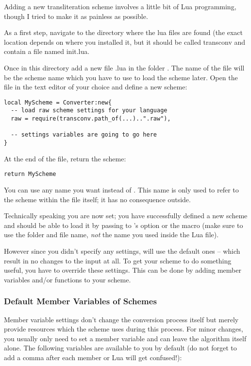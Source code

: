 \documentclass{ltxdockit}
\begin{document}
Adding a new transliteration scheme involves a little bit of Lua programming,
though I tried to make it as painless as possible.

As a first step, navigate to the directory where the  lua files are
found (the exact location depends on where you installed it, but it should be
called transconv and contain a file named init.lua.

Once in this directory add a new file .lua in the folder .
The name of the file will be the scheme name which you have to use to load the
scheme later. Open the file in the text editor of your choice and define a new
scheme:

\begin{lstlisting}
local MyScheme = Converter:new{
  -- load raw scheme settings for your language
  raw = require(transconv.path_of(...)..".raw"),

  -- settings variables are going to go here
}
\end{lstlisting}

At the end of the file, return the scheme:

\begin{lstlisting}
return MyScheme
\end{lstlisting}

You can use any name you want instead of . This name is only used
to refer to the scheme within the file itself; it has no consequence outside.

Technically speaking you are now set; you have successfully defined a new scheme
and should be able to load it by passing  to
's  option or the
 macro (make sure to use the
folder and file name, \emph{not} the name you used inside the Lua file).

However since you didn't specify any settings,  will use the
default ones -- which result in no changes to the input at all. To get your
scheme to do something useful, you have to override these settings. This can be
done by adding member variables and/or functions to your scheme.

\subsubsection{Default Member Variables of Schemes}

Member variable settings don't change the conversion process itself but merely
provide resources which the scheme uses during this process. For minor changes,
you usually only need to set a member variable and can leave the algorithm
itself alone. The following variables are available to you by default (do not
forget to add a comma after each member or Lua will get confused!):
\end{document}
